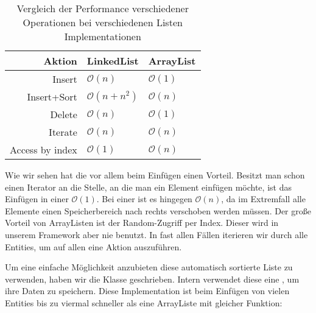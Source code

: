 \begin{table}[h]
\begin{tabular}{|r|l|l|}
\hline
Aktion          & LinkedList             & ArrayList        \\ \hline
Insert          & $ \mathcal O(n)       $ & $ \mathcal O(1) $ \\ \hline
Insert+Sort     & $ \mathcal O(n + n^2) $ & $ \mathcal O(n) $ \\ \hline
Delete          & $ \mathcal O(n)       $ & $ \mathcal O(1) $ \\ \hline
Iterate         & $ \mathcal O(n)       $ & $ \mathcal O(n) $ \\ \hline
Access by index & $ \mathcal O(1)       $ & $ \mathcal O(n) $ \\ \hline
\end{tabular}
\caption{Vergleich der Performance verschiedener Operationen bei verschiedenen Listen Implementationen}
\end{table} %

Wie wir sehen hat die  vor allem beim Einfügen  einen Vorteil. Besitzt man schon einen Iterator an die Stelle, an die man ein Element einfügen möchte, ist das Einfügen in einer  $\mathcal O(1)$. Bei einer  ist es hingegen $\mathcal O(n)$, da im Extremfall alle Elemente einen Speicherbereich nach rechts verschoben werden müssen.
Der große Vorteil von ArrayListen ist der Random-Zugriff per Index. Dieser wird in unserem Framework aber nie benutzt. In fast allen Fällen iterieren wir durch alle Entities, um auf allen eine Aktion auszuführen.

Um eine einfache Möglichkeit anzubieten diese automatisch sortierte Liste zu verwenden, haben wir die Klasse  geschrieben. Intern verwendet diese eine , um ihre Daten zu speichern. Diese Implementation ist beim Einfügen von vielen Entities bis zu viermal schneller als eine ArrayListe mit gleicher Funktion:

